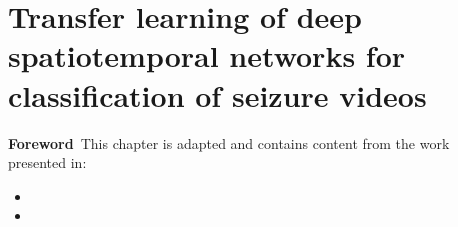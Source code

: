 \chapter[Transfer learning for classification of seizure videos]{Transfer learning of deep spatiotemporal networks for classification of seizure videos}

\label{chap:videos}
\minitoc

\begin{center}
  \begin{minipage}[b]{0.9\linewidth}
    \small
    \textbf{Foreword\,}
    This chapter is adapted and contains content from the work presented in:
    \begin{itemize}
      \item {}
      \item {}
    \end{itemize}
  \end{minipage}
\end{center}



\acresetall
\bodyspacing





\onehalfspacing %
